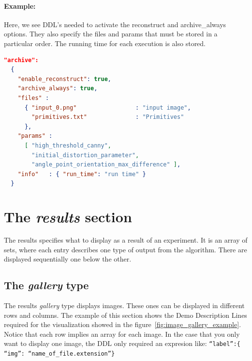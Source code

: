 \paragraph{Example:}
Here, we see DDL's needed to activate the reconstruct and archive\_always options. They also specify the files and params that must be stored in a particular order. The running time for each execution is also stored.
\\
\begin{lstlisting}[language=json,firstnumber=1]
"archive":
  {
    "enable_reconstruct": true,
    "archive_always": true,
    "files" : 
      { "input_0.png"                 : "input image",
        "primitives.txt"              : "Primitives"
      },
    "params" :  
      [ "high_threshold_canny", 
        "initial_distortion_parameter", 
        "angle_point_orientation_max_difference" ],
    "info"   : { "run_time": "run time" }
  }
\end{lstlisting}

\section{The \emph{results} section}

The results specifies what to display as a result of an experiment. It is an array of sets, where each entry describes one type of output from the algorithm. There are displayed sequentially one below the other.

\subsection{The \emph{gallery} type}

The results \emph{gallery} type displays images. These ones can be displayed in different rows and columns. The example of this section shows the Demo Description Lines required for the visualization showed in the figure~\ref{fig:image_gallery_example}. Notice that each row implies an array for each image. In the case that you only want to display one image, the DDL only required an expresion like:  \texttt{``label'':\{ ``img'': ``name\_of\_file.extension''\}}


